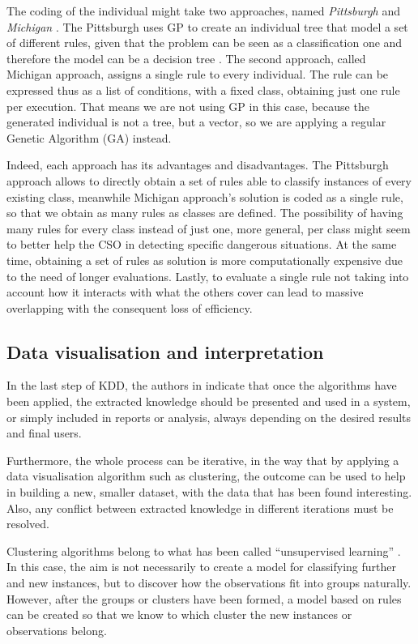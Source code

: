 The coding of the individual might take two approaches, named \textit{Pittsburgh} and \textit{Michigan} \cite{freitas2002data}. The Pittsburgh uses GP to create an individual tree that model a set of different rules, given that the problem can be seen as
a classification one and therefore the model can be a decision tree \cite{safavian1990survey}. The second approach, called Michigan approach, assigns a single rule to every individual. The rule can be expressed thus as a list of conditions, with a fixed class, obtaining just one rule per execution. That means we are not using GP in this case, because the generated individual is not a tree, but a vector, so we are applying a regular Genetic Algorithm (GA) instead.

Indeed, each approach has its advantages and disadvantages. The Pittsburgh approach allows to directly obtain a set of rules able to classify instances of every existing class, meanwhile Michigan approach's solution is coded as a single rule, so that we obtain as many rules as classes are defined. The possibility of having many rules for every class instead of just one, more general, per class might seem to better help the CSO in detecting specific dangerous situations.
At the same time, obtaining a set of rules as solution is more computationally expensive due to the need of longer evaluations. Lastly, to evaluate a single rule not taking into account how it interacts with what the others cover \cite{freitas2002data} can lead to massive overlapping with the consequent loss of efficiency. 

\subsection{Data visualisation and interpretation}

In the last step of KDD, the authors in \cite{fayyad1996data} indicate that once the algorithms have been applied, the extracted knowledge should be presented and used in a system, or simply included in reports or analysis, always depending on the desired results and final users.

Furthermore, the whole process can be iterative, in the way that by applying a data visualisation algorithm such as clustering, the outcome can be used to help in building a new, smaller dataset, with the data that has been found interesting. Also, any conflict between extracted knowledge in different iterations must be resolved.

Clustering algorithms belong to what has been called ``unsupervised learning'' \cite{hartigan1975clustering}. In this case, the aim is not necessarily to create a model for classifying further and new instances, but to discover how the observations fit into groups naturally. However, after the groups or clusters have been formed, a model based on rules can be created so that we know to which cluster the new instances or observations belong.

